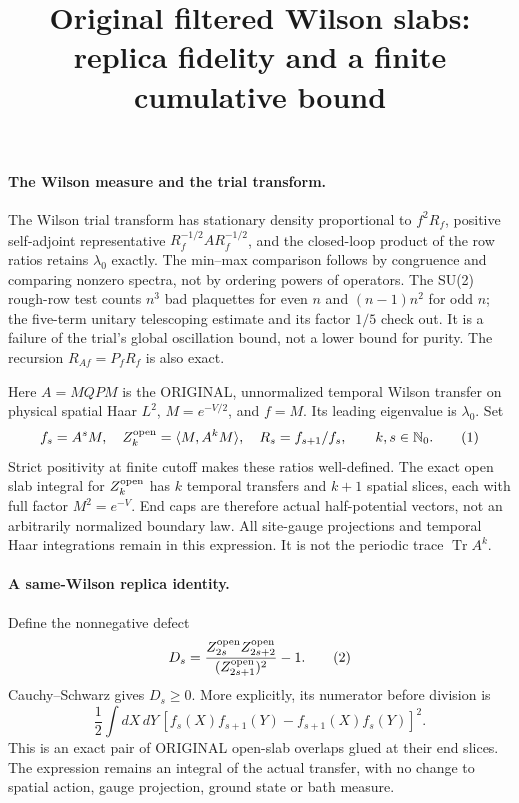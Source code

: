 \documentclass[11pt]{article}
\title{Original filtered Wilson slabs: replica fidelity and a finite cumulative bound}\author{}\date{}
\begin{document}
\maketitle
\paragraph{The Wilson measure and the trial transform.}
The Wilson trial transform has
stationary density proportional to $f^2R_f$, positive self-adjoint representative
$R_f^{-1/2}AR_f^{-1/2}$, and the closed-loop product of the row ratios retains
$\lambda_0$ exactly. The min--max comparison follows by congruence and comparing
nonzero spectra, not by ordering powers of operators. The SU(2) rough-row test
counts $n^3$ bad plaquettes for even $n$ and $(n-1)n^2$ for odd $n$; the
five-term unitary telescoping estimate and its factor $1/5$ check out. It is a
failure of the trial's global oscillation bound, not a lower bound for purity.
The recursion $R_{A f}=P_fR_f$ is also exact.

Here $A=M Q P M$ is the ORIGINAL, unnormalized temporal Wilson transfer on
physical spatial Haar $L^2$, $M=e^{-V/2}$, and $f=M$. Its leading eigenvalue is
$\lambda_0$. Set
\[
 f_s=A^sM,\quad Z_k^{\rm open}=\langle M,A^kM\rangle,
 \quad R_s=f_{s+1}/f_s,\qquad k,s\in\mathbb N_0.       \tag{1}
\]
Strict positivity at finite cutoff makes these ratios well-defined. The exact
open slab integral for $Z_k^{\rm open}$ has $k$ temporal transfers and $k+1$
spatial slices, each with full factor $M^2=e^{-V}$. End caps are therefore actual
half-potential vectors, not an arbitrarily normalized boundary law. All site-gauge
projections and temporal Haar integrations remain in this expression. It is not
the periodic trace $\operatorname{Tr}A^k$.

\paragraph{A same-Wilson replica identity.}
Define the nonnegative defect
\[
 D_s=\frac{Z_{2s}^{\rm open} Z_{2s+2}^{\rm open}}
                {(Z_{2s+1}^{\rm open})^2}-1.          \tag{2}
\]
Cauchy--Schwarz gives $D_s\ge0$. More explicitly, its numerator before division is
\[
 \frac12\int dX\,dY\,
 [f_s(X)f_{s+1}(Y)-f_{s+1}(X)f_s(Y)]^2.                \tag{3}
\]
This is an exact pair of ORIGINAL open-slab overlaps glued at their end slices.
The expression remains an integral of the actual transfer, with no change to
spatial action, gauge projection, ground state or bath measure.
\end{document}
